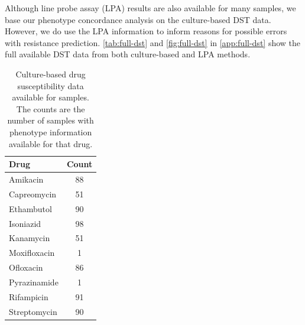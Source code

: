 Although line probe assay (LPA) results are also available for many samples, we base our phenotype concordance analysis on the culture-based DST data. However, we do use the LPA information to inform reasons for possible errors with resistance prediction. \autoref{tab:full-dst} and \autoref{fig:full-dst} in \autoref{app:full-dst} show the full available DST data from both culture-based and LPA methods.

\begin{table}
\centering
\begin{tabular}{|l|c|}
\hline
Drug         & Count \\ \hline
Amikacin     & 88    \\ \hline
Capreomycin  & 51    \\ \hline
Ethambutol   & 90    \\ \hline
Isoniazid    & 98    \\ \hline
Kanamycin    & 51    \\ \hline
Moxifloxacin & 1     \\ \hline
Ofloxacin    & 86    \\ \hline
Pyrazinamide & 1     \\ \hline
Rifampicin   & 91    \\ \hline
Streptomycin & 90    \\ \hline
\end{tabular}
\caption{Culture-based drug susceptibility data available for samples. The counts are the number of samples with phenotype information available for that drug.}
\label{tab:available-dst}
\end{table}

